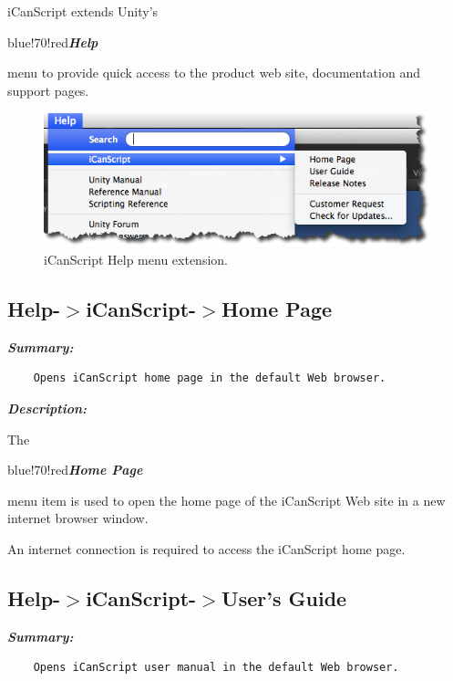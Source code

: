 iCanScript extends Unity's \begin{color}{blue!70!red}\emph{\textbf{Help}}\end{color} menu to provide quick access to the product web site, documentation and support pages.

\begin{figure}[htbp]
\centering
\includegraphics[keepaspectratio,width=\textwidth,height=0.75\textheight]{ics-menu-help.png}
\caption{iCanScript Help menu extension.}
\label{ics-menu-help.png}
\end{figure}

\subsection{Help-$>$iCanScript-$>$Home Page}
\label{help-icanscript-homepage}

\emph{\textbf{Summary:}}

\begin{verbatim}
    Opens iCanScript home page in the default Web browser.
\end{verbatim}

\emph{\textbf{Description:}}

The \begin{color}{blue!70!red}\emph{\textbf{Home Page}}\end{color} menu item is used to open the home page of the iCanScript Web site in a new internet browser window.

An internet connection is required to access the iCanScript home page.

\subsection{Help-$>$iCanScript-$>$User's Guide}
\label{help-icanscript-usersguide}

\emph{\textbf{Summary:}}

\begin{verbatim}
    Opens iCanScript user manual in the default Web browser.
\end{verbatim}

